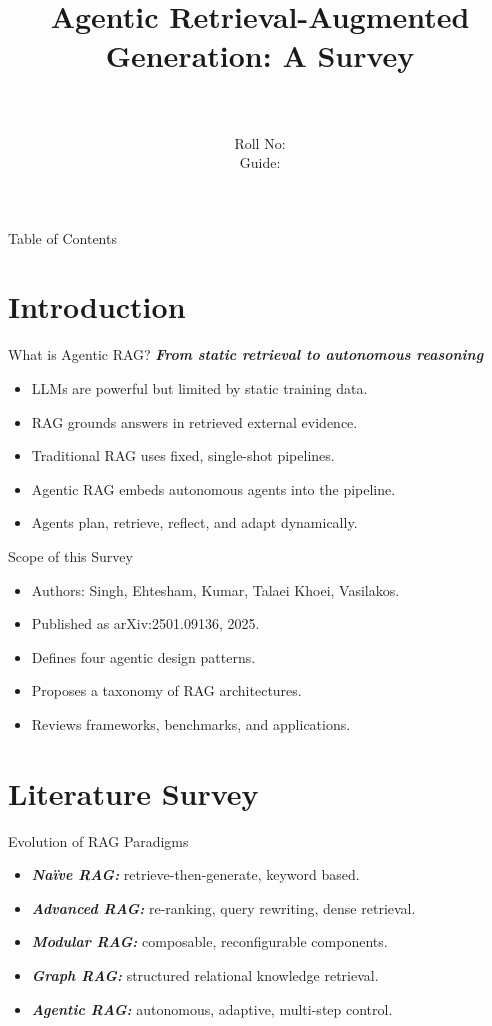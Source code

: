 \documentclass{beamer}
\title[\seminarShortTitle]{Agentic Retrieval-Augmented Generation: A Survey}
\author[\seminarName\ (\seminarShortCollege)]{\seminarName \\ \seminarRoll \\ Roll No: \seminarClassRoll \\ Guide: \seminarGuide}
\institute[\seminarShortCollege]{\seminarDept \\ \seminarCollege}
\date{\seminarDate}
\begin{document}
\begin{frame}\titlepage\end{frame}
\begin{frame}{Table of Contents}\tableofcontents\end{frame}
\section{Introduction}
\begin{frame}{What is Agentic RAG?}
\textbf{\textit{From static retrieval to autonomous reasoning}}
\begin{itemize}
\item LLMs are powerful but limited by static training data.
\item RAG grounds answers in retrieved external evidence.
\item Traditional RAG uses fixed, single-shot pipelines.
\item Agentic RAG embeds autonomous agents into the pipeline.
\item Agents plan, retrieve, reflect, and adapt dynamically.
\end{itemize}
\end{frame}

\begin{frame}{Scope of this Survey}
\begin{itemize}
\item Authors: Singh, Ehtesham, Kumar, Talaei Khoei, Vasilakos.
\item Published as arXiv:2501.09136, 2025.
\item Defines four agentic design patterns.
\item Proposes a taxonomy of RAG architectures.
\item Reviews frameworks, benchmarks, and applications.
\end{itemize}
\end{frame}

\section{Literature Survey}
\begin{frame}{Evolution of RAG Paradigms}
\begin{itemize}
\item \textbf{\textit{Na\"ive RAG:}} retrieve-then-generate, keyword based.
\item \textbf{\textit{Advanced RAG:}} re-ranking, query rewriting, dense retrieval.
\item \textbf{\textit{Modular RAG:}} composable, reconfigurable components.
\item \textbf{\textit{Graph RAG:}} structured relational knowledge retrieval.
\item \textbf{\textit{Agentic RAG:}} autonomous, adaptive, multi-step control.
\end{itemize}
\end{frame}
\end{document}
